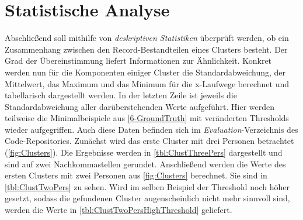 \section{Statistische Analyse}
\label{6-Statistical}
Abschließend soll mithilfe von \emph{deskriptiven Statistiken} überprüft werden,
ob ein Zusammenhang zwischen den Record-Bestandteilen eines Clusters besteht.
Der Grad der Übereinstimmung liefert Informationen zur Ähnlichkeit.
Konkret werden nun für die Komponenten einiger Cluster
die Standardabweichung, der Mittelwert, das Maximum und das Minimum für die x-Laufwege berechnet
und tabellarisch dargestellt werden.
In der letzten Zeile ist jeweils die Standardabweichung aller darüberstehenden Werte aufgeführt.
Hier werden teilweise die Minimalbeispiele aus \autoref{6-GroundTruth} mit veränderten Thresholds wieder aufgegriffen.
Auch diese Daten befinden sich im \emph{Evaluation}-Verzeichnis des Code-Repositories.
Zunächst wird das erste Cluster mit drei Personen betrachtet (\autoref{fig:Clusters}).
Die Ergebnisse werden in \autoref{tbl:ClustThreePers} dargestellt
und sind auf zwei Nachkommastellen gerundet.
Anschließend werden die Werte des ersten Clusters mit zwei Personen aus \autoref{fig:Clusters} berechnet.
Sie sind in \autoref{tbl:ClustTwoPers} zu sehen.
Wird im selben Beispiel der Threshold noch höher gesetzt,
sodass die gefundenen Cluster augenscheinlich nicht mehr sinnvoll sind,
werden die Werte in \autoref{tbl:ClustTwoPersHighThreshold} geliefert.
